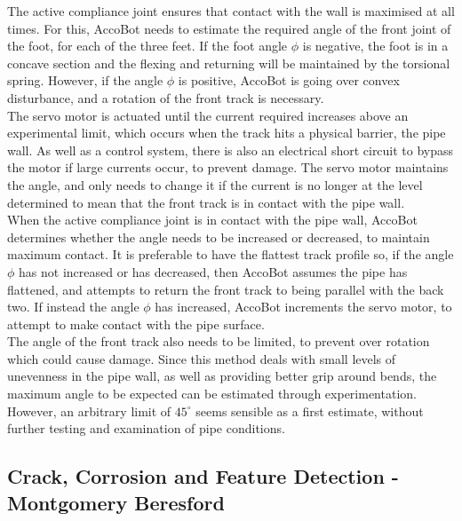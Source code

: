 \documentclass[11pt]{article}		%
\begin{document}
			The active compliance joint ensures that contact with the wall is maximised at all times.
			For this, AccoBot needs to estimate the required angle of the front joint of the foot, for each of the three feet.
			If the foot angle $\phi$ is negative, the foot is in a concave section and the flexing and returning will be maintained by the torsional spring.
			However, if the angle $\phi$ is positive, AccoBot is going over convex disturbance, and a rotation of the front track is necessary.
			\\
	        \hspace*{3ex}The servo motor is actuated until the current required increases above an experimental limit, which occurs when the track hits a physical barrier, the pipe wall.
			As well as a control system, there is also an electrical short circuit to bypass the motor if large currents occur, to prevent damage.
			The servo motor maintains the angle, and only needs to change it if the current is no longer at the level determined to mean that the front track is in contact with the pipe wall.
			\\
	        \hspace*{3ex}When the active compliance joint is in contact with the pipe wall, AccoBot determines whether the angle needs to be increased or decreased, to maintain maximum contact.
			It is preferable to have the flattest track profile so, if the angle $\phi$ has not increased or has decreased, then AccoBot assumes the pipe has flattened, and attempts to return the front track to being parallel with the back two.
			If instead the angle $\phi$ has increased, AccoBot increments the servo motor, to attempt to make contact with the pipe surface.
			\\
	        \hspace*{3ex}The angle of the front track also needs to be limited, to prevent over rotation which could cause damage.
			Since this method deals with small levels of unevenness in the pipe wall, as well as providing better grip around bends, the maximum angle to be expected can be estimated through experimentation.
			However, an arbitrary limit of $45^\circ$ seems sensible as a first estimate, without further testing and examination of pipe conditions.
				
		\subsection[Crack, Corrosion and Feature Detection]{Crack, Corrosion and Feature Detection - Montgomery Beresford} \label{featureDetection}\label{visual}
		
\end{document}
